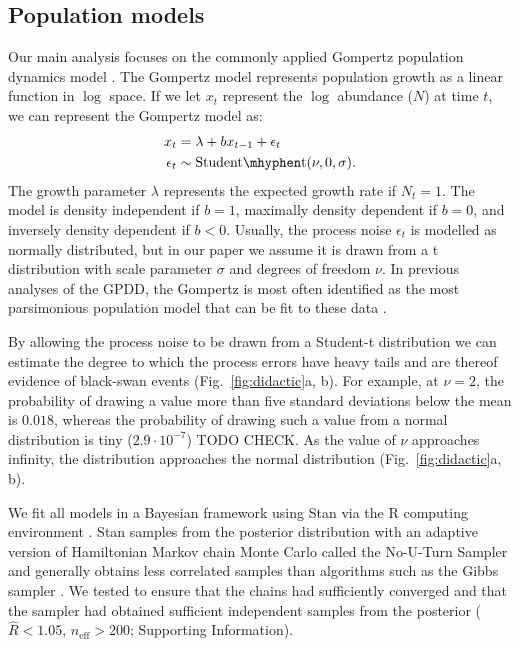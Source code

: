 \subsection{Population models}

Our main analysis focuses on the commonly applied Gompertz population dynamics model \citep[e.g.][]{knape2012,dennis2014,connors2014}. The Gompertz model represents population growth as a linear function in $\log$ space. If we let $x_t$ represent the $\log$ abundance ($N$) at time $t$, we can represent the Gompertz model as:
\begin{align*}
x_t &= \lambda + b x_{t-1} + \epsilon_t\\
\epsilon_t &\sim \mathrm{Student\mhyphen t}(\nu, 0, \sigma).
\end{align*}
The growth parameter $\lambda$ represents the expected growth rate if $N_t = 1$. The model is density independent if $b = 1$, maximally density dependent if $b = 0$, and inversely density dependent if $b < 0$. Usually, the process noise $\epsilon_t$ is modelled as normally distributed, but in our paper we assume it is drawn from a t distribution with scale parameter $\sigma$ and degrees of freedom $\nu$. In previous analyses of the GPDD, the Gompertz is most often identified as the most parsimonious population model that can be fit to these data \citep{brook2006}.

By allowing the process noise to be drawn from a Student-t distribution we can estimate the degree to which the process errors have heavy tails and are thereof evidence of black-swan events (Fig.~\ref{fig:didactic}a, b). For example, at $\nu = 2$, the probability of drawing a value more than five standard deviations below the mean is $0.018$, whereas the probability of drawing such a value from a normal distribution is tiny ($2.9\cdot10^{-7}$) TODO CHECK. As the value of $\nu$ approaches infinity, the distribution approaches the normal distribution (Fig.~\ref{fig:didactic}a, b).


We fit all models in a Bayesian framework using Stan \citep{stan-manual2014} via the R computing environment \citep{r2014}. Stan samples from the posterior distribution with an adaptive version of Hamiltonian Markov chain Monte Carlo called the No-U-Turn Sampler and generally obtains less correlated samples than algorithms such as the Gibbs sampler \citep{hoffman2014}. We tested to ensure that the chains had sufficiently converged and that the sampler had obtained sufficient independent samples from the posterior ($\widehat{R} < 1.05$, $n_\mathrm{eff} > 200$; Supporting Information).

